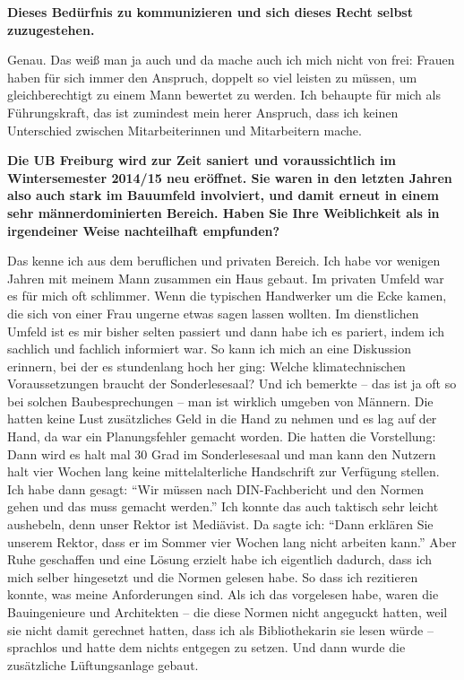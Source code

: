 \documentclass[a4paper,
fontsize=11pt,
oneside,
numbers=noperiodatend,
parskip=half-,
bibliography=totoc,
final
]{scrartcl}
\begin{document}
\textbf{Dieses Bedürfnis zu kommunizieren und sich dieses Recht selbst
zuzugestehen.}

Genau. Das weiß man ja auch und da mache auch ich mich nicht von frei:
Frauen haben für sich immer den Anspruch, doppelt so viel leisten zu
müssen, um gleichberechtigt zu einem Mann bewertet zu werden. Ich
behaupte für mich als Führungskraft, das ist zumindest mein herer
Anspruch, dass ich keinen Unterschied zwischen Mitarbeiterinnen und
Mitarbeitern mache.

\textbf{Die UB Freiburg wird zur Zeit saniert und voraussichtlich im
Wintersemester 2014/15 neu eröffnet. Sie waren in den letzten Jahren
also auch stark im Bauumfeld involviert, und damit erneut in einem sehr
männerdominierten Bereich. Haben Sie Ihre Weiblichkeit als in
irgendeiner Weise nachteilhaft empfunden?}

Das kenne ich aus dem beruflichen und privaten Bereich. Ich habe vor
wenigen Jahren mit meinem Mann zusammen ein Haus gebaut. Im privaten
Umfeld war es für mich oft schlimmer. Wenn die typischen Handwerker um
die Ecke kamen, die sich von einer Frau ungerne etwas sagen lassen
wollten. Im dienstlichen Umfeld ist es mir bisher selten passiert und
dann habe ich es pariert, indem ich sachlich und fachlich informiert
war. So kann ich mich an eine Diskussion erinnern, bei der es
stundenlang hoch her ging: Welche klimatechnischen Voraussetzungen
braucht der Sonderlesesaal? Und ich bemerkte -- das ist ja oft so bei
solchen Baubesprechungen -- man ist wirklich umgeben von Männern. Die
hatten keine Lust zusätzliches Geld in die Hand zu nehmen und es lag auf
der Hand, da war ein Planungsfehler gemacht worden. Die hatten die
Vorstellung: Dann wird es halt mal 30 Grad im Sonderlesesaal und man
kann den Nutzern halt vier Wochen lang keine mittelalterliche
Handschrift zur Verfügung stellen. Ich habe dann gesagt: \enquote{Wir
müssen nach DIN-Fachbericht und den Normen gehen und das muss gemacht
werden.} Ich konnte das auch taktisch sehr leicht aushebeln, denn unser
Rektor ist Mediävist. Da sagte ich: \enquote{Dann erklären Sie unserem
Rektor, dass er im Sommer vier Wochen lang nicht arbeiten kann.} Aber
Ruhe geschaffen und eine Lösung erzielt habe ich eigentlich dadurch,
dass ich mich selber hingesetzt und die Normen gelesen habe. So dass ich
rezitieren konnte, was meine Anforderungen sind. Als ich das vorgelesen
habe, waren die Bauingenieure und Architekten -- die diese Normen nicht
angeguckt hatten, weil sie nicht damit gerechnet hatten, dass ich als
Bibliothekarin sie lesen würde -- sprachlos und hatte dem nichts
entgegen zu setzen. Und dann wurde die zusätzliche Lüftungsanlage
gebaut.
\end{document}
